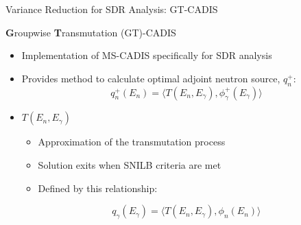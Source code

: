 \documentclass{beamer}
\begin{document}
%
		
\begin{frame}{Variance Reduction for SDR Analysis: GT-CADIS}
\begin{block}{\textbf{G}roupwise \textbf{T}ransmutation (GT)-CADIS \cite{gtcadis}}
  \begin{itemize}
  \item{Implementation of MS-CADIS specifically for SDR analysis}
  \item{Provides method to calculate optimal adjoint neutron source, $q_n^+$:}
\begin{equation}
	q^{+}_n(E_n) = \langle T(E_n, E_{\gamma}) ,
	\phi_{\gamma}^{+}(E_{\gamma}) \rangle
\end{equation}
\item{$T(E_n, E_{\gamma})$ }%
		  \begin{itemize}
			  \item{Approximation of the transmutation
				  process}
			  \item{Solution exits when SNILB criteria
				  are met}
			  \item{Defined by this relationship:}
		  \end{itemize}
\begin{equation} \label{eq:Tdef}
	q_{\gamma}(E_{\gamma}) = 
	\langle T(E_{n}, E_{\gamma}),
	\phi_{n}(E_{n}) \rangle
\end{equation}

  \end{itemize}
\end{block}
%
%
\end{frame}
\end{document}
